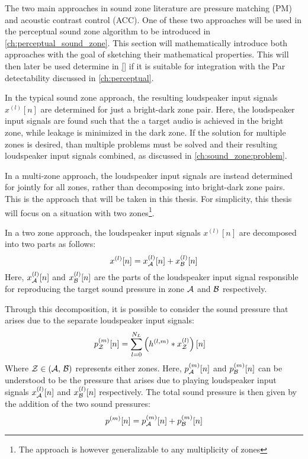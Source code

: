 The two main approaches in sound zone literature are pressure matching (PM) and acoustic contrast control (ACC).
One of these two approaches will be used in the perceptual sound zone algorithm to be introduced in \autoref{ch:perceptual_sound_zone}.
This section will mathematically introduce both approaches with the goal of sketching their mathematical properties.
This will then later be used determine in \autoref{} if it is suitable for integration with the Par detectability discussed in \autoref{ch:perceptual}.

In the typical sound zone approach, the resulting loudspeaker input signals $x^{(l)}[n]$ are determined for just a bright-dark zone pair.
Here, the loudspeaker input signals are found such that the a target audio is achieved in the bright zone, while leakage is minimized in the dark zone.
If the solution for multiple zones is desired, than multiple problems must be solved and their resulting loudspeaker input signals combined, as discussed
in \autoref{ch:sound_zone:problem}. 

In a multi-zone approach, the loudspeaker input signals are instead determined for jointly for all zones, rather than decomposing into bright-dark zone pairs.
This is the approach that will be taken in this thesis.
For simplicity, this thesis will focus on a situation with two zones\footnote{The approach is however generalizable to any multiplicity of zones}.

In a two zone approach, the loudspeaker input signals $x^{(l)}[n]$ are decomposed into two parts as follows:
\begin{equation}
    x^{(l)}[n] = x_{\mathcal{A}}^{(l)}[n] + x_{\mathcal{B}}^{(l)}[n]
\end{equation}
Here, $x_{\mathcal{A}}^{(l)}[n]$ and $x_{\mathcal{B}}^{(l)}[n]$ are the parts of the loudspeaker input signal responsible for reproducing the target sound pressure 
in zone $\mathcal{A}$ and $\mathcal{B}$ respectively.

Through this decomposition, it is possible to consider the sound pressure that arises due to the separate loudspeaker input signals:
\begin{align}
    p_{\mathcal{Z}}^{(m)}[n] &= \sum_{l=0}^{N_L} \left(h^{(l,m)} \ast x_{\mathcal{Z}}^{(l)}\right)[n] 
\end{align}
Where $\mathcal{Z} \in \left(\mathcal{A},\,\mathcal{B}\right)$ represents either zones.
Here, $p_{\mathcal{A}}^{(m)}[n]$ and $p_{\mathcal{B}}^{(m)}[n]$ can be understood to be the pressure that arises due to 
playing loudspeaker input signals $x_{\mathcal{A}}^{(l)}[n]$ and $x_{\mathcal{B}}^{(l)}[n]$ respectively. 
The total sound pressure is then given by the addition of the two sound pressures:
\begin{equation}
    p^{(m)}[n] = p_{\mathcal{A}}^{(m)}[n] + p_{\mathcal{B}}^{(m)}[n]
\end{equation}

